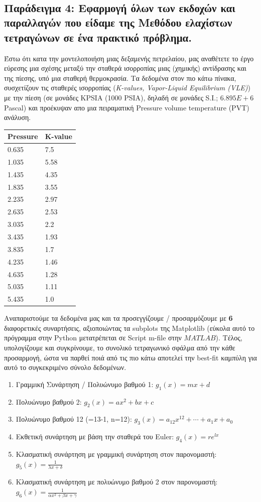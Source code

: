 \documentclass[12pt]{article}
\begin{document}
    \begin{center}
    \end{center}
    { \hspace*{\fill} \\}
    
    

\subsection{Παράδειγμα 4: Εφαρμογή όλων των εκδοχών και παραλλαγών  που είδαμε της Μεθόδου ελαχίστων τετραγώνων σε ένα πρακτικό πρόβλημα.}

    Έστω ότι κατα την μοντελοποιήση μιας δεξαμενής πετρελαίου, μας αναθέτετε
το έργο εύρεσης μια σχέσης μεταξύ την σταθερά ισορροπίας μιας (χημικής)
αντίδρασης και της πίεσης, υπό μια σταθερή θερμοκρασία. Τα δεδομένα στον
πιο κάτω πίνακα, συσχετίζουν τις σταθερές ισορροπίας (\emph{K-values,
Vapor-Liquid Equilibrium (VLE)}) με την πίεση (σε μονάδες ΚPSIA (1000
PSIA), δηλαδή σε μονάδες S.I.; \(6.895E+6\) Pascal) και προέκυψαν απο
μια πειραματική Pressure volume temperature (PVT) ανάλυση.

\begin{longtable}[]{@{}ll@{}}
\toprule
Pressure & K-value\tabularnewline
\midrule
\endhead
0.635 & 7.5\tabularnewline
1.035 & 5.58\tabularnewline
1.435 & 4.35\tabularnewline
1.835 & 3.55\tabularnewline
2.235 & 2.97\tabularnewline
2.635 & 2.53\tabularnewline
3.035 & 2.2\tabularnewline
3.435 & 1.93\tabularnewline
3.835 & 1.7\tabularnewline
4.235 & 1.46\tabularnewline
4.635 & 1.28\tabularnewline
5.035 & 1.11\tabularnewline
5.435 & 1.0\tabularnewline
\bottomrule
\end{longtable}

Αναπαριστούμε τα δεδομένα μας και τα προσεγγίζουμε / προσαρμόζουμε με
\textbf{6} διαφορετικές συναρτήσεις, αξιοποιώντας τα subplots της
Matplotlib (εύκολα αυτό το πρόγραμμα στην Python μετατρέπεται σε Script
m-file στην \(MATLAB\)). Tέλος, υπολογίζουμε και συγκρίνουμε, το
συνολικό τετραγωνικό σφάλμα από την κάθε προσαρμογή, ώστα να παρθεί ποιά
από τις πιο κάτω αποτελεί την best-fit καμπύλη για αυτό το συγκεκριμένο
σύνολο δεδομένων.

\begin{enumerate}
\def\labelenumi{\arabic{enumi}.}
\item
  Γραμμική Συνάρτηση / Πολυώνυμο βαθμού 1: \(g_1(x)=mx+d\)
\item
  Πολυώνυμο βαθμού 2: \(g_2(x)=ax^2+bx+c\)
\item
  Πολυώνυμο βαθμού 12 (=13-1, n=12):
  \(g_3(x)=a_{12}x^{12}+ \cdots +a_1x+a_0\)
\item
  Eκθετική συνάρτηση με βάση την σταθερά του Euler: \(g_4(x)=re^{lx}\)
\item
  Κλασματική συνάρτηση με γραμμική συνάρτηση στον παρονομαστή:
  \(g_5(x)=\frac{1}{\lambda x+\delta}\)
\item
  Κλασματική συνάρτηση με πολυώνυμο βαθμού 2 στον παρονομαστή:
  \(g_6(x)=\frac{1}{\alpha x^2+\beta x+\gamma}\)
\end{enumerate}
\end{document}
